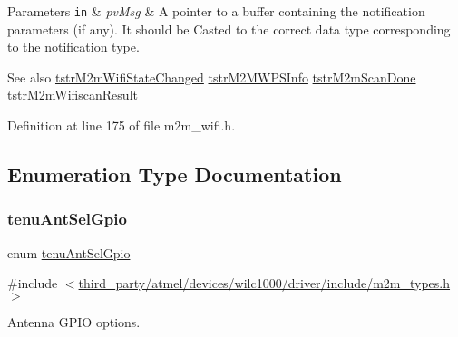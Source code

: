 \begin{DoxyParams}[1]{Parameters}
\mbox{\tt in}  & {\em pv\+Msg} & A pointer to a buffer containing the notification parameters (if any). It should be Casted to the correct data type corresponding to the notification type.\\
\hline
\end{DoxyParams}
\begin{DoxySeeAlso}{See also}
\hyperlink{structtstrM2mWifiStateChanged}{tstr\+M2m\+Wifi\+State\+Changed} \hyperlink{structtstrM2MWPSInfo}{tstr\+M2\+M\+W\+P\+S\+Info} \hyperlink{structtstrM2mScanDone}{tstr\+M2m\+Scan\+Done} \hyperlink{structtstrM2mWifiscanResult}{tstr\+M2m\+Wifiscan\+Result} 
\end{DoxySeeAlso}


Definition at line 175 of file m2m\+\_\+wifi.\+h.



\subsection{Enumeration Type Documentation}
\mbox{\label{group__WlanEnums_ga79d8d22335f19b2d3a8cc95b915792ce}} 
\subsubsection{\texorpdfstring{tenu\+Ant\+Sel\+Gpio}{tenuAntSelGpio}}
{\footnotesize\ttfamily enum \hyperlink{group__WlanEnums_ga79d8d22335f19b2d3a8cc95b915792ce}{tenu\+Ant\+Sel\+Gpio}}



{\ttfamily \#include $<$\hyperlink{m2m__types_8h}{third\+\_\+party/atmel/devices/wilc1000/driver/include/m2m\+\_\+types.\+h}$>$}



Antenna G\+P\+IO options. 

